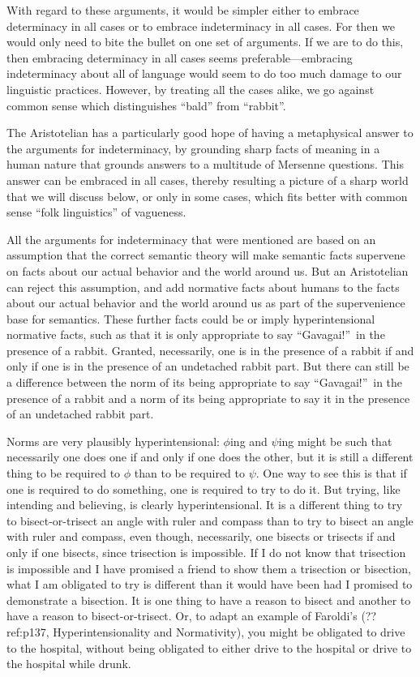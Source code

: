 With regard to these arguments, it would be simpler either to embrace determinacy in all cases or to embrace indeterminacy in all 
cases. For then we would only need to bite the bullet on one set of arguments. If we are to do this, then embracing determinacy in
all cases seems preferable---embracing indeterminacy about all of language would seem to do too much damage to our linguistic practices.
However, by treating all the cases alike, we go against common sense which distinguishes ``bald'' from ``rabbit''. 

The Aristotelian has a particularly good hope of having a metaphysical answer to the arguments for indeterminacy,
by grounding sharp facts of meaning in a human nature that grounds answers to a multitude of Mersenne questions.
This answer can be embraced in all cases, thereby resulting a picture of a sharp world that we will discuss below, 
or only in some cases, which fits better with common sense ``folk linguistics'' of vagueness.

All the arguments for indeterminacy that were mentioned are based on an assumption that the correct semantic theory will make semantic facts supervene on
facts about our actual behavior and the world around us. But an Aristotelian can reject this assumption, and add normative facts about humans 
to the facts about our actual behavior and the world around us as part of the supervenience base for semantics. These further
facts could be or imply hyperintensional normative
facts, such as that it is only appropriate to say ``Gavagai!''\ in the presence of a rabbit. Granted, necessarily, one is in the
presence of a rabbit if and only if one is in the presence of an undetached rabbit part. But there can still be a difference between
the norm of its being appropriate to say ``Gavagai!''\ in the presence of a rabbit and a norm of its being appropriate to say it 
in the presence of an undetached rabbit part.

Norms are very plausibly hyperintensional: $\phi$ing and $\psi$ing might be such that necessarily one does one if and only if one does the other,
but it is still a different thing to be required to $\phi$ than to be required to $\psi$. One way to see this is that if one
is required to do something, one is required to try to do it. But trying, like intending and believing, is clearly hyperintensional.
It is a different thing to try to bisect-or-trisect an angle with ruler and compass than to try to bisect an angle with ruler and 
compass, even though, necessarily, one bisects or trisects if and only if one bisects, since trisection is impossible. If I do not
know that trisection is impossible and I have promised a friend to show them a trisection or bisection, what I am obligated to try
is different than it would have been had I promised to demonstrate a bisection. 
It is one thing to have a reason to bisect and another to have a reason to bisect-or-trisect. Or, to adapt an example of 
Faroldi's (??ref:p137, Hyperintensionality
and Normativity), you might be obligated to drive to the hospital, without being obligated to either drive to the hospital or 
drive to the hospital while drunk. 

